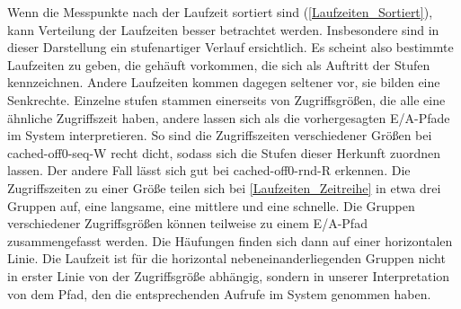 \documentclass[
	12pt,
	a4paper,
	BCOR10mm,
	DIV14,
	listof=totoc,
	bibliography=totoc,
	headsepline
]{scrreprt}
\begin{document}
Wenn die Messpunkte nach der Laufzeit sortiert sind (\ref{Laufzeiten_Sortiert}), kann Verteilung der Laufzeiten besser betrachtet werden.
Insbesondere sind in dieser Darstellung ein stufenartiger Verlauf ersichtlich.
Es scheint also bestimmte Laufzeiten zu geben, die gehäuft vorkommen, die sich als Auftritt der Stufen kennzeichnen. Andere Laufzeiten kommen dagegen seltener vor, sie bilden eine Senkrechte.
Einzelne stufen stammen einerseits von Zugriffsgrößen, die alle eine ähnliche Zugriffszeit haben, andere lassen sich als die vorhergesagten E/A-Pfade im System interpretieren.
So sind die Zugriffszeiten verschiedener Größen bei cached-off0-seq-W recht dicht, sodass sich die Stufen dieser Herkunft zuordnen lassen.
Der andere Fall lässt sich gut bei cached-off0-rnd-R erkennen. Die Zugriffszeiten zu einer Größe teilen sich bei \ref{Laufzeiten_Zeitreihe} in etwa drei Gruppen auf, eine langsame, eine mittlere und eine schnelle.
Die Gruppen verschiedener Zugriffsgrößen können teilweise zu einem E/A-Pfad zusammengefasst werden. Die Häufungen finden sich dann auf einer horizontalen Linie. 
Die Laufzeit ist für die horizontal nebeneinanderliegenden Gruppen nicht in erster Linie von der Zugriffsgröße abhängig, sondern in unserer Interpretation von dem Pfad, den die entsprechenden Aufrufe im System genommen haben. 
\end{document}
